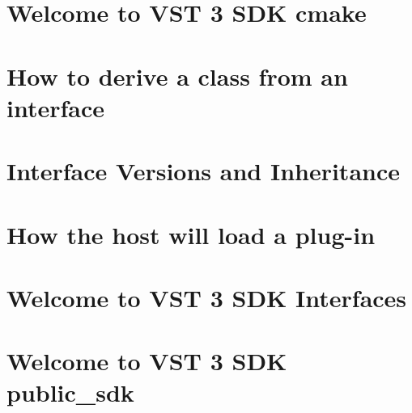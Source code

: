 \let\mypdfximage\pdfximage\def\pdfximage{\immediate\mypdfximage}\documentclass[twoside]{book}
\newcommand{\+}{\discretionary{\mbox{\scriptsize$\hookleftarrow$}}{}{}}
\begin{document}
\chapter{Welcome to V\+ST 3 S\+DK cmake}
\label{md__c_1__users_fab_src__github_branches__neural_amp_modeler_plugin_i_plug2__dependencies__i_plug221d2d8ae6d245be31be332c72e61476}

\chapter{How to derive a class from an interface}
\label{howto_class}

\chapter{Interface Versions and Inheritance}
\label{version_inheritance}

\chapter{How the host will load a plug-\/in}
\label{load_plugin}

\chapter{Welcome to V\+ST 3 S\+DK Interfaces}
\label{md__c_1__users_fab_src__github_branches__neural_amp_modeler_plugin_i_plug2__dependencies__i_plug29aa4c37bf30da24c0d547c27c0442ff}

\chapter{Welcome to V\+ST 3 S\+DK public\+\_\+sdk}
\label{md__c_1__users_fab_src__github_branches__neural_amp_modeler_plugin_i_plug2__dependencies__i_pluga1d2ceacca6e11f139aecb10b798f8ea}

\end{document}
